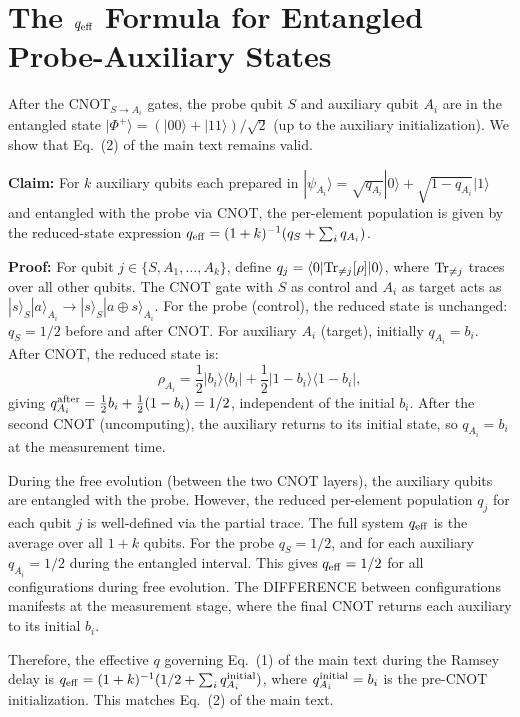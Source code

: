 \documentclass[aps,prl,twocolumn]{revtex4-2}
\begin{document}
\section{The $q_{\rm eff}$ Formula for Entangled Probe-Auxiliary States}

After the CNOT$_{S \to A_i}$ gates, the probe qubit $S$ and auxiliary qubit $A_i$ are in the entangled state $|\Phi^+\rangle = (|00\rangle + |11\rangle)/\sqrt{2}$ (up to the auxiliary initialization). We show that Eq.~(2) of the main text remains valid.

\textbf{Claim:} For $k$ auxiliary qubits each prepared in $|\psi_{A_i}\rangle = \sqrt{q_{A_i}}|0\rangle + \sqrt{1-q_{A_i}}|1\rangle$ and entangled with the probe via CNOT, the per-element population is given by the reduced-state expression $q_{\rm eff} = (1+k)^{-1}(q_S + \sum_i q_{A_i})$.

\textbf{Proof:} For qubit $j \in \{S, A_1, \ldots, A_k\}$, define $q_j = \langle 0|{\rm Tr}_{\neq j}[\rho]|0\rangle$, where ${\rm Tr}_{\neq j}$ traces over all other qubits. The CNOT gate with $S$ as control and $A_i$ as target acts as $|s\rangle_S|a\rangle_{A_i} \to |s\rangle_S|a \oplus s\rangle_{A_i}$. For the probe (control), the reduced state is unchanged: $q_S = 1/2$ before and after CNOT. For auxiliary $A_i$ (target), initially $q_{A_i} = b_i$. After CNOT, the reduced state is:
\begin{equation}
\rho_{A_i} = \frac{1}{2}|b_i\rangle\langle b_i| + \frac{1}{2}|1-b_i\rangle\langle 1-b_i|,
\end{equation}
giving $q_{A_i}^{\rm after} = \frac{1}{2}b_i + \frac{1}{2}(1-b_i) = 1/2$, independent of the initial $b_i$. After the second CNOT (uncomputing), the auxiliary returns to its initial state, so $q_{A_i} = b_i$ at the measurement time.

During the free evolution (between the two CNOT layers), the auxiliary qubits are entangled with the probe. However, the reduced per-element population $q_j$ for each qubit $j$ is well-defined via the partial trace. The full system $q_{\rm eff}$ is the average over all $1+k$ qubits. For the probe $q_S=1/2$, and for each auxiliary $q_{A_i}=1/2$ during the entangled interval. This gives $q_{\rm eff}=1/2$ for all configurations during free evolution. The DIFFERENCE between configurations manifests at the measurement stage, where the final CNOT returns each auxiliary to its initial $b_i$.

Therefore, the effective $q$ governing Eq.~(1) of the main text during the Ramsey delay is $q_{\rm eff} = (1+k)^{-1}(1/2 + \sum_i q_{A_i}^{\rm initial})$, where $q_{A_i}^{\rm initial} = b_i$ is the pre-CNOT initialization. This matches Eq.~(2) of the main text.
\end{document}
